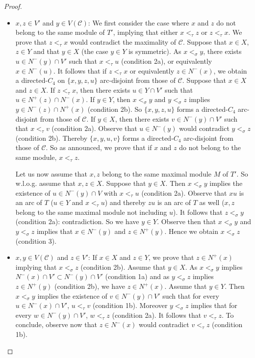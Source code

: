 \begin{proof}
\begin{proofclaim}
\begin{itemize}
\item $x,z\in V'$ and $y\in V(\mathcal{C})$: 
We first consider the case where $x$ and $z$ do not belong to the same module of $T'$, implying that either $x<_\tau z$ or $z<_\tau x$. We prove that $z<_\tau x$ would contradict the maximality of $\mathcal{C}$. Suppose that $x\in X$, $z\in Y$ and that $y\in X$ (the case $y\in Y$ is symmetric). As $x<_\sigma y$, there exists $u\in N^-(y)\cap V'$ such that $x<_\tau u$ (condition 2a), or equivalently $x\in N^-(u)$. It follows that if $z<_\tau x$ or equivalently $z\in N^-(x)$, we obtain a directed-$C_4$ on $\{x,y,z,u\}$ arc-disjoint from those of $\mathcal{C}$. Suppose that $x\in X$ and $z\in X$. If $z<_\tau x$, then there exists $u\in Y\cap V'$ such that $u\in N^+(z)\cap N^-(x)$. If $y\in Y$, then $x<_\sigma y$ and $y<_{\sigma} z$ implies $y\in N^-(z)\cap N^+(x)$ (condition 2b). So $\{x,y,z,u\}$ forms a directed-$C_4$ arc-disjoint from those of $\mathcal{C}$. If $y\in X$, then there exists $v\in N^-(y)\cap V'$ such that $x<_\tau v$ (condition 2a). Observe that $u\in N^-(y)$ would contradict $y<_\sigma z$ (condition 2b). Thereby $\{x,y,u,v\}$ forms a directed-$C_4$ arc-disjoint from those of $\mathcal{C}$. So as announced, we prove that if $x$ and $z$ do not belong to the same module,  $x<_\tau z$.

Let us now assume that $x, z$ belong to the same maximal module $M$ of $T'$. So w.l.o.g. assume that $x,z\in X$. Suppose that $y\in X$. Then $x<_{\sigma} y$ implies the existence of $u\in N^-(y)\cap V$ with $x<_{\tau} u$ (condition 2a). Observe that $xu$ is an arc of $T$ ($u\in Y$ and $x<_{\tau} u$) and thereby $zu$ is an arc of $T$ as well ($x,z$ belong to the same maximal module not including $u$). It follows that $z<_{\sigma} y$ (condition 2a): contradiction. So we have $y\in Y$. Observe then that $x<_{\sigma} y$ and $y<_{\sigma} z$ implies that $x\in N^-(y)$ and $z\in N^+(y)$. Hence we obtain $x<_{\sigma} z$ (condition 3).


\item $x,y \in V(\mathcal{C})$ and $z\in V'$: If $x\in X$ and $z\in Y$, we prove that $z\in N^+(x)$ implying that $x<_{\sigma} z$ (condition 2b). Assume that $y\in X$. As $x<_{\sigma} y$ implies $N^-(x)\cap V' \subset N^-(y)\cap V'$ (condition 1a) and as $y<_{\sigma} z$ implies $z\in N^+(y)$ (condition 2b), we have $z\in N^+(x)$. Assume that $y\in Y$. Then $x<_{\sigma} y$ implies the existence of $v\in N^-(y)\cap V'$ such that for every $u\in N^-(x)\cap V'$, $u<_{\tau} v$ (condition 1b). Moreover $y<_{\sigma} z$ implies that for every $w\in N^-(y)\cap V'$, $w<_{\tau} z$ (condition 2a). It follows that $v<_{\tau} z$. To conclude, observe now that $z\in N^-(x)$ would contradict $v<_\tau z$ (condition 1b). 




\end{itemize}
\end{proofclaim}
\end{proof}
